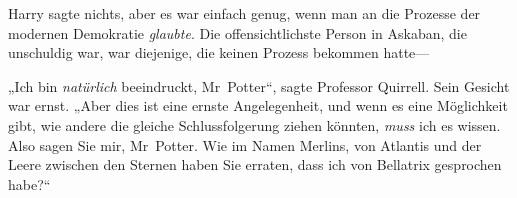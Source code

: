 Harry sagte nichts, aber es war einfach genug, wenn man an die Prozesse der modernen Demokratie \emph{glaubte}. Die offensichtlichste Person in Askaban, die unschuldig war, war diejenige, die keinen Prozess bekommen hatte—

„Ich bin \emph{natürlich} beeindruckt, Mr~Potter“, sagte Professor Quirrell. Sein Gesicht war ernst. „Aber dies ist eine ernste Angelegenheit, und wenn es eine Möglichkeit gibt, wie andere die gleiche Schlussfolgerung ziehen könnten, \emph{muss} ich es wissen. Also sagen Sie mir, Mr~Potter. Wie im Namen Merlins, von Atlantis und der Leere zwischen den Sternen haben Sie erraten, dass ich von Bellatrix gesprochen habe?“

